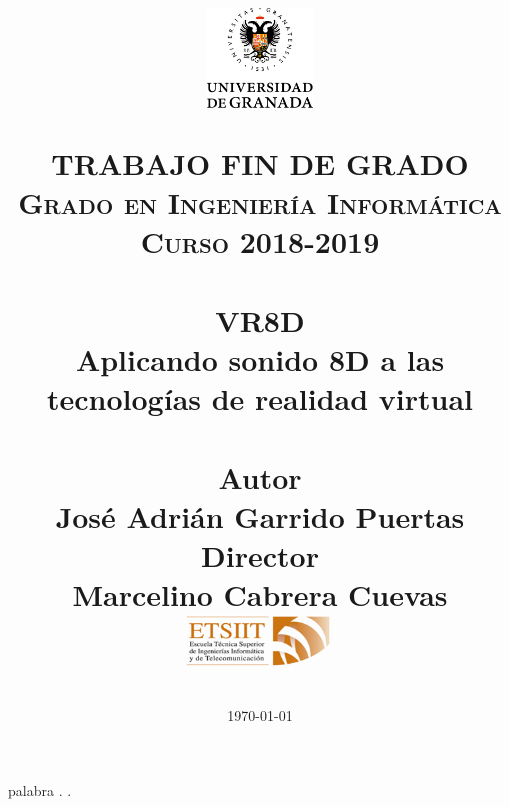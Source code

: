 
\usepackage{url}

\title{	
	\normalfont \normalsize
	\begin{figure}[htb]
		\centering
		\includegraphics[width=0.25\textwidth]{./imagenes/1}
	\end{figure}
	\textsc{\textbf{TRABAJO FIN DE GRADO} \\ Grado en Ingeniería Informática \\ 
	Curso 2018-2019} \\ [25pt] 
	\horrule{0.5pt} \\[0.4cm]
	\huge VR8D \\
	\huge Aplicando sonido 8D a las tecnologías de realidad virtual
	\\ 
	\horrule{2pt} \\[0.5cm]
	\textbf{Autor}\\ {José Adrián Garrido Puertas}\\[1.0ex]
	\textbf{Director}\\ {Marcelino Cabrera Cuevas}\\[0.5cm]
	\includegraphics[width=0.3\textwidth]{imagenes/etsiit_logo.png}\\[0.1cm]
	\date{\normalsize\today} 
}





	
	\maketitle %
	
	\thispagestyle{empty} 	%
	\textcolor[rgb]{1.00,1.00,1.00}{palabra} 
	\newpage %
	\thispagestyle{empty} 
	\textcolor[rgb]{1.00,1.00,1.00}{.}  
	\newpage %
	\thispagestyle{empty} 
	\textcolor[rgb]{1.00,1.00,1.00}{.} 
	\newpage %
	
